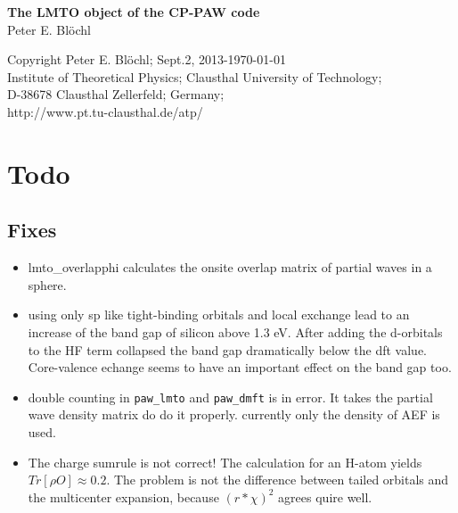 \documentclass[11pt,a4paper]{report}
\begin{document}
\begin{titlepage}
\begin{center}
\vspace*{3.5cm}
{\huge \textbf{The LMTO object of the CP-PAW code}}\\
\vspace{0.5cm}
{\large Peter E. Bl\"ochl}
\vspace{0.5cm} 
\end{center}

\vfill
\begin{center}
Copyright Peter E. Bl\"ochl; Sept.2, 2013-\today\\
{\small
Institute of Theoretical Physics;
Clausthal University of Technology;\\ 
D-38678 Clausthal Zellerfeld; Germany;\\
http://www.pt.tu-clausthal.de/atp/}
\end{center}
\end{titlepage}
\noindent            
\tableofcontents
\chapter{Todo}
\section{Fixes}
\begin{itemize}
\item lmto\_overlapphi calculates the onsite overlap matrix of partial
  waves in a sphere.
%
\item using only sp like tight-binding orbitals and local exchange
  lead to an increase of the band gap of silicon above 1.3 eV. After
  adding the d-orbitals to the HF term collapsed the band gap
  dramatically below the dft value. Core-valence echange seems to have
  an important effect on the band gap too.
%
\item double counting in \verb|paw_lmto| and \verb|paw_dmft| is in
  error. It takes the partial wave density matrix do do it
  properly. currently only the density of AEF is used.
%
\item The charge sumrule is not correct! The calculation for an H-atom
  yields $Tr[\rho O]\approx 0.2$. The problem is not the difference
  between tailed orbitals and the multicenter expansion, because
  $(r*\chi)^2$ agrees quire well.
%
\end{itemize}
\end{document}
